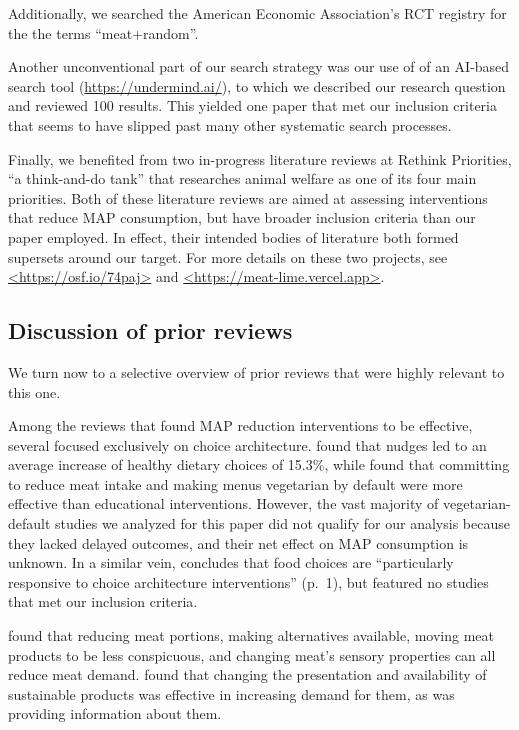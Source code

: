 \documentclass[sn-nature,referee,pdflatex]{sn-jnl}
\begin{document}
Additionally, we searched the American Economic Association's RCT
registry for the the terms ``meat+random''.

Another unconventional part of our search strategy was our use of of an
AI-based search tool (\url{https://undermind.ai/}), to which we
described our research question and reviewed 100 results. This yielded
one paper that met our inclusion criteria \citep{mattson2020} that seems
to have slipped past many other systematic search processes.

Finally, we benefited from two in-progress literature reviews at Rethink
Priorities, ``a think-and-do tank'' that researches animal welfare as
one of its four main priorities. Both of these literature reviews are
aimed at assessing interventions that reduce MAP consumption, but have
broader inclusion criteria than our paper employed. In effect, their
intended bodies of literature both formed supersets around our target.
For more details on these two projects, see \url{<https://osf.io/74paj>}
and \url{<https://meat-lime.vercel.app>}.

\subsection{Discussion of prior
reviews}\label{discussion-of-prior-reviews}

We turn now to a selective overview of prior reviews that were highly
relevant to this one.

Among the reviews that found MAP reduction interventions to be
effective, several focused exclusively on choice architecture.
\citep{arno2016} found that nudges led to an average increase of healthy
dietary choices of 15.3\%, while \citep{byerly2018} found that
committing to reduce meat intake and making menus vegetarian by default
were more effective than educational interventions. However, the vast
majority of vegetarian-default studies we analyzed for this paper did
not qualify for our analysis because they lacked delayed outcomes, and
their net effect on MAP consumption is unknown. In a similar vein,
\citep{mertens2022} concludes that food choices are ``particularly
responsive to choice architecture interventions'' (p.~1), but featured
no studies that met our inclusion criteria.

\citep{bianchi2018restructuring} found that reducing meat portions,
making alternatives available, moving meat products to be less
conspicuous, and changing meat's sensory properties can all reduce meat
demand. \citep{pandey2023} found that changing the presentation and
availability of sustainable products was effective in increasing demand
for them, as was providing information about them.
\end{document}
